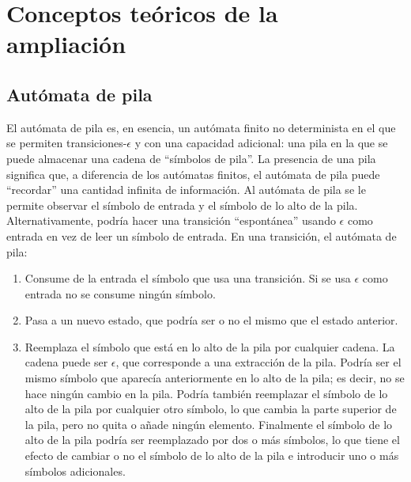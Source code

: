 \documentclass[12pt,a4paper,spanish]{book}
\begin{document}
\section{Conceptos te\'oricos de la ampliaci\'on}
\subsection{Aut\'omata de pila}
El aut\'omata de pila es, en esencia, un aut\'omata finito no determinista en el que
se permiten transiciones-$\epsilon$ y con una capacidad adicional: una pila en la
que se puede almacenar una cadena de ``s\'imbolos de pila''. La presencia de una
pila significa que, a diferencia de los aut\'omatas finitos, el aut\'omata de pila puede
``recordar'' una cantidad infinita de informaci\'on.
Al aut\'omata de pila se le permite observar el s\'imbolo de entrada y el s\'imbolo de lo
alto de la pila. Alternativamente, podr\'ia hacer una transici\'on ``espont\'anea'' usando
$\epsilon$ como entrada en vez de leer un s\'imbolo de entrada. En una transici\'on, el
aut\'omata de pila:
\begin{enumerate}
\item Consume de la entrada el s\'imbolo que usa una transici\'on. Si se usa $\epsilon$
como entrada no se consume ning\'un s\'imbolo.
\item Pasa a un nuevo estado, que podr\'ia ser o no el mismo que el estado anterior.
\item Reemplaza el s\'imbolo que est\'a en lo alto de la pila por cualquier cadena. La
cadena puede ser $\epsilon$, que corresponde a una extracci\'on de la pila. Podr\'ia
ser el mismo s\'imbolo que aparec\'ia anteriormente en lo alto de la pila; es decir, no
se hace ning\'un cambio en la pila. Podr\'ia tambi\'en reemplazar el s\'imbolo de lo alto
de la pila por cualquier otro s\'imbolo, lo que cambia la parte superior de la pila, pero
no quita o a\~nade ning\'un elemento. Finalmente el s\'imbolo de lo alto de la pila podr\'ia
ser reemplazado por dos o m\'as s\'imbolos, lo que tiene el efecto de cambiar o no el
s\'imbolo de lo alto de la pila e introducir uno o m\'as s\'imbolos adicionales.\\
\end{enumerate}
\end{document}
